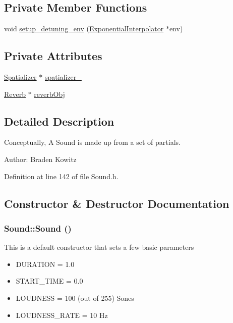 \subsection*{Private Member Functions}
\begin{CompactItemize}
\item 
void \hyperlink{classSound_d0}{setup\_\-detuning\_\-env} (\hyperlink{classExponentialInterpolator}{Exponential\-Interpolator} $\ast$env)
\end{CompactItemize}
\subsection*{Private Attributes}
\begin{CompactItemize}
\item 
\hyperlink{classSpatializer}{Spatializer} $\ast$ \hyperlink{classSound_r0}{spatializer\_\-}
\item 
\hyperlink{classReverb}{Reverb} $\ast$ \hyperlink{classSound_r1}{reverb\-Obj}
\end{CompactItemize}


\subsection{Detailed Description}
Conceptually, A Sound is made up from a set of partials. \begin{Desc}
\item[Author:]Braden Kowitz \end{Desc}




Definition at line 142 of file Sound.h.

\subsection{Constructor \& Destructor Documentation}
\hypertarget{classSound_a0}{
\subsubsection[Sound]{\setlength{\rightskip}{0pt plus 5cm}Sound::Sound ()}}
\label{classSound_a0}


This is a default constructor that sets a few basic parameters\begin{itemize}
\item DURATION = 1.0\item START\_\-TIME = 0.0\item LOUDNESS = 100 (out of 255) Sones\item LOUDNESS\_\-RATE = 10 Hz \end{itemize}


